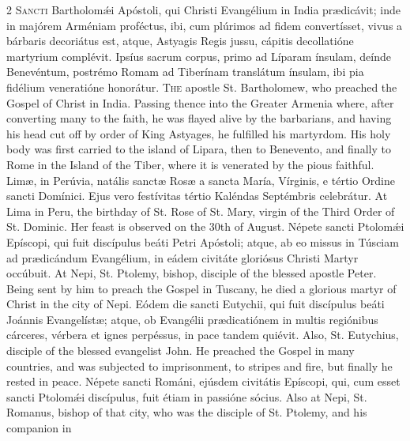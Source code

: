 \begin{paracol}{2}
\lettrine[lines=2]{S}{ancti} Bartholomǽi 
 Apóstoli, qui Christi Evangélium in India prædicávit; inde in majórem 
 Arméniam proféctus, ibi, cum plúrimos ad fidem convertísset, vivus a 
 bárbaris decoriátus est, atque, Astyagis Regis jussu, cápitis decollatióne 
 martyrium complévit. Ipsíus sacrum corpus, primo ad Líparam ínsulam, 
 deínde Benevéntum, postrémo Romam ad Tiberínam translátum ínsulam, ibi pia 
 fidélium veneratióne honorátur.
\switchcolumn
{}
\lettrine[lines=2]{T}{he} apostle St. Bartholomew, who 
 preached the Gospel of Christ in India. Passing thence into the 
 Greater Armenia where, after converting many to the faith, he was flayed 
 alive by the barbarians, and having his head cut off by order of King 
 Astyages, he fulfilled his martyrdom. His holy body was first carried 
 to the island of Lipara, then to Benevento, and finally to Rome in the 
 Island of the Tiber, where it is venerated by the pious faithful.
\switchcolumn*
{}
Limæ, in Perúvia, 
 natális sanctæ Rosæ a sancta María, Vírginis, e tértio Ordine sancti 
 Domínici. Ejus vero festívitas tértio Kaléndas Septémbris celebrátur.
\switchcolumn
{}
At Lima in Peru, the birthday of St. 
 Rose of St. Mary, virgin of the Third Order of St. Dominic. Her feast 
 is observed on the 30th of August.
\switchcolumn*
{}
Népete sancti Ptolomǽi 
 Epíscopi, qui fuit discípulus beáti Petri Apóstoli; atque, ab eo missus in 
 Túsciam ad prædicándum Evangélium, in eádem civitáte gloriósus Christi 
 Martyr occúbuit.
\switchcolumn
{}
At Nepi, St. Ptolemy, bishop, 
 disciple of the blessed apostle Peter. Being sent by him to preach the 
 Gospel in Tuscany, he died a glorious martyr of Christ in the city of Nepi.
\switchcolumn*
{}
Eódem die sancti 
 Eutychii, qui fuit discípulus beáti Joánnis Evangelístæ; atque, ob Evangélii 
 prædicatiónem in multis regiónibus cárceres, vérbera et ignes perpéssus, in 
 pace tandem quiévit.
\switchcolumn
{}
Also, St. Eutychius, disciple of the 
 blessed evangelist John. He preached the Gospel in many countries, and 
 was subjected to imprisonment, to stripes and fire, but finally he rested in 
 peace.
\switchcolumn*
{}
Népete sancti Románi, 
 ejúsdem civitátis Epíscopi, qui, cum esset sancti Ptolomǽi discípulus, fuit 
 étiam in passióne sócius.
\switchcolumn
{}
Also at Nepi, St. Romanus, bishop of 
 that city, who was the disciple of St. Ptolemy, and his companion in 

\end{paracol}
